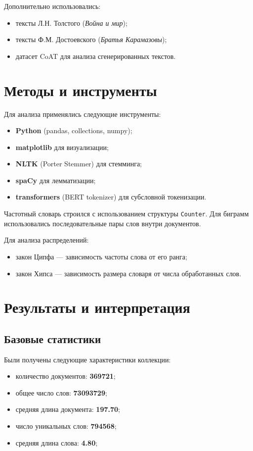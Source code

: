 \documentclass[11pt]{article}
\begin{document}
Дополнительно использовались:
\begin{itemize}
    \item тексты Л.Н. Толстого (\textit{Война и мир});
    \item тексты Ф.М. Достоевского (\textit{Братья Карамазовы});
    \item датасет CoAT для анализа сгенерированных текстов.
\end{itemize}

\section{Методы и инструменты}

Для анализа применялись следующие инструменты:
\begin{itemize}
    \item \textbf{Python} (pandas, collections, numpy);
    \item \textbf{matplotlib} для визуализации;
    \item \textbf{NLTK} (Porter Stemmer) для стемминга;
    \item \textbf{spaCy} для лемматизации;
    \item \textbf{transformers} (BERT tokenizer) для субсловной токенизации.
\end{itemize}

Частотный словарь строился с использованием структуры \texttt{Counter}. Для
биграмм использовались последовательные пары слов внутри документов.

Для анализа распределений:
\begin{itemize}
    \item закон Ципфа — зависимость частоты слова от его ранга;
    \item закон Хипса — зависимость размера словаря от числа обработанных слов.
\end{itemize}

\section{Результаты и интерпретация}

\subsection{Базовые статистики}

Были получены следующие характеристики коллекции:

\begin{itemize}
    \item количество документов: \textbf{369721};
    \item общее число слов: \textbf{73093729};
    \item средняя длина документа: \textbf{197.70};
    \item число уникальных слов: \textbf{794568};
    \item средняя длина слова: \textbf{4.80};
\end{itemize}
\end{document}
